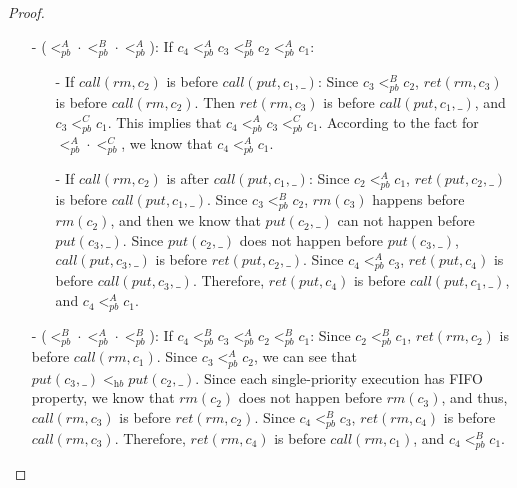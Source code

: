 \begin {proof}
\begin{itemize}
\item[-]  ($<_{\textit{pb}}^A \cdot <_{\textit{pb}}^B \cdot <_{\textit{pb}}^A$): If $c_4 <_{\textit{pb}}^A c_3 <_{\textit{pb}}^B c_2 <_{\textit{pb}}^A c_1$:
    \begin{itemize}
    \setlength{\itemsep}{0.5pt}
    \item[-] If $\textit{call}(\textit{rm},c_2)$ is before $\textit{call}(\textit{put},c_1,\_)$: Since $c_3 <_{\textit{pb}}^B c_2$, $\textit{ret}(\textit{rm},c_3)$ is before $\textit{call}(\textit{rm},c_2)$. Then $\textit{ret}(\textit{rm},c_3)$ is before $\textit{call}(\textit{put},c_1,\_)$, and $c_3 <_{\textit{pb}}^C c_1$. This implies that $c_4 <_{\textit{pb}}^A c_3 <_{\textit{pb}}^C c_1$. According to the fact for $<_{\textit{pb}}^A \cdot <_{\textit{pb}}^C$, we know that $c_4  <_{\textit{pb}}^A c_1$.

    \item[-] If $\textit{call}(\textit{rm},c_2)$ is after $\textit{call}(\textit{put},c_1,\_)$: Since $c_2 <_{\textit{pb}}^A c_1$, $\textit{ret}(\textit{put},c_2,\_)$ is before $\textit{call}(\textit{put},c_1,\_)$. Since $c_3 <_{\textit{pb}}^B c_2$, $\textit{rm}(c_3)$ happens before $\textit{rm}(c_2)$, and then we know that $\textit{put}(c_2,\_)$ can not happen before $\textit{put}(c_3,\_)$. Since $\textit{put}(c_2,\_)$ does not happen before $\textit{put}(c_3,\_)$, $\textit{call}(\textit{put},c_3,\_)$ is before $\textit{ret}(\textit{put},c_2,\_)$. Since $c_4 <_{\textit{pb}}^A c_3$, $\textit{ret}(\textit{put},c_4)$ is before $\textit{call}(\textit{put},c_3,\_)$. Therefore, $\textit{ret}(\textit{put},c_4)$ is before $\textit{call}(\textit{put},c_1,\_)$, and $c_4 <_{\textit{pb}}^A c_1$.
    \end{itemize}

\item[-]  ($<_{\textit{pb}}^B \cdot <_{\textit{pb}}^A \cdot <_{\textit{pb}}^B$): If $c_4 <_{\textit{pb}}^B c_3 <_{\textit{pb}}^A c_2 <_{\textit{pb}}^B c_1$: Since $c_2 <_{\textit{pb}}^B c_1$, $\textit{ret}(\textit{rm},c_2)$ is before $\textit{call}(\textit{rm},c_1)$. Since $c_3 <_{\textit{pb}}^A c_2$, we can see that $\textit{put}(c_3,\_) <_{\textit{hb}} \textit{put}(c_2,\_)$. Since each single-priority execution has FIFO property, we know that $\textit{rm}(c_2)$ does not happen before $\textit{rm}(c_3)$, and thus, $\textit{call}(\textit{rm},c_3)$ is before $\textit{ret}(\textit{rm},c_2)$. Since $c_4 <_{\textit{pb}}^B c_3$, $\textit{ret}(\textit{rm},c_4)$ is before $\textit{call}(\textit{rm},c_3)$. Therefore, $\textit{ret}(\textit{rm},c_4)$ is before $\textit{call}(\textit{rm},c_1)$, and $c_4 <_{\textit{pb}}^B c_1$.


\end{itemize}
\end{proof}
